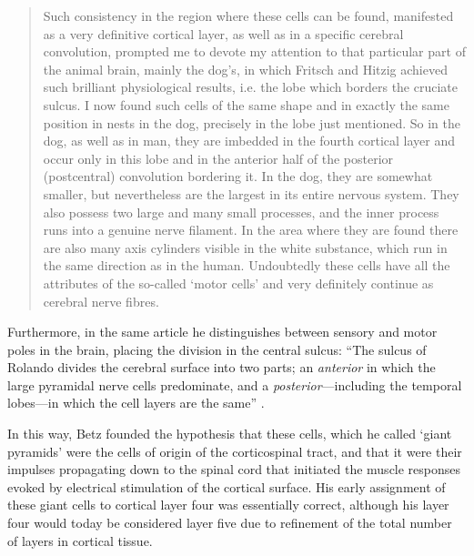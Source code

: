 \blockquote[{\protect\cite{Betz1874, Kushchayev2012}}]{Such consistency in the region where these cells can be found, manifested as a very definitive cortical layer, as well as in a specific cerebral convolution, prompted me to devote my attention to that particular part of the animal brain, mainly the dog’s, in which Fritsch and Hitzig achieved such brilliant physiological results, i.e. the lobe which borders the cruciate sulcus. I now found such cells of the same shape and in exactly the same position in nests in the dog, precisely in the lobe just mentioned. So in the dog, as well as in man, they are imbedded in the fourth cortical layer and occur only in this lobe and in the anterior half of the posterior (postcentral) convolution bordering it. In the dog, they are somewhat smaller, but nevertheless are the largest in its entire nervous system. They also possess two large and many small processes, and the inner process runs into a genuine nerve filament. In the area where they are found there are also many axis cylinders visible in the white substance, which run in the same direction as in the human. Undoubtedly these cells have all the attributes of the so-called ‘motor cells’ and very definitely continue as cerebral nerve fibres.}

Furthermore, in the same article he distinguishes between sensory and motor poles in the brain, placing the division in the central sulcus: ``The sulcus of Rolando divides the cerebral surface into two parts; an \emph{anterior} in which the large pyramidal nerve cells predominate, and a \emph{posterior}---including the temporal lobes---in which the cell layers are the same'' \cite{Betz1874,Clarke1996}.

In this way, Betz founded the hypothesis that these cells, which he called ‘giant pyramids’ were the cells of origin of the corticospinal tract, and that it were their impulses propagating down to the spinal cord that initiated the muscle responses evoked by electrical stimulation of the cortical surface. His early assignment of these giant cells to cortical layer four was essentially correct, although his layer four would today be considered layer five due to refinement of the total number of layers in cortical tissue.

